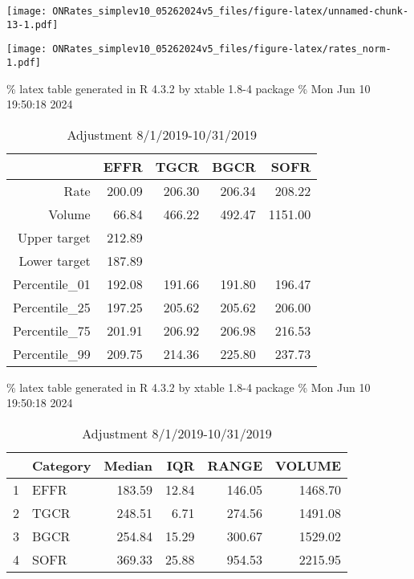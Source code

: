 \documentclass[
]{article}
\begin{document}
\FloatBarrier

\texttt{[image: ONRates\_simplev10\_05262024v5\_files/figure-latex/unnamed-chunk-13-1.pdf]}

\FloatBarrier

\FloatBarrier

\texttt{[image: ONRates\_simplev10\_05262024v5\_files/figure-latex/rates\_norm-1.pdf]}
\FloatBarrier

\% latex table generated in R 4.3.2 by xtable 1.8-4 package
\% Mon Jun 10 19:50:18 2024

\begin{table}[ht]
\centering
\begin{tabular}{rrrrr}
  \hline
 & EFFR & TGCR & BGCR & SOFR \\ 
  \hline
Rate & 200.09 & 206.30 & 206.34 & 208.22 \\ 
  Volume & 66.84 & 466.22 & 492.47 & 1151.00 \\ 
  Upper target & 212.89 &  &  &  \\ 
  Lower target & 187.89 &  &  &  \\ 
  Percentile\_01 & 192.08 & 191.66 & 191.80 & 196.47 \\ 
  Percentile\_25 & 197.25 & 205.62 & 205.62 & 206.00 \\ 
  Percentile\_75 & 201.91 & 206.92 & 206.98 & 216.53 \\ 
  Percentile\_99 & 209.75 & 214.36 & 225.80 & 237.73 \\ 
   \hline
\end{tabular}
\caption{Adjustment 8/1/2019-10/31/2019} 
\end{table}

\% latex table generated in R 4.3.2 by xtable 1.8-4 package
\% Mon Jun 10 19:50:18 2024

\begin{table}[ht]
\centering
\begin{tabular}{rlrrrr}
  \hline
 & Category & Median & IQR & RANGE & VOLUME \\ 
  \hline
1 & EFFR & 183.59 & 12.84 & 146.05 & 1468.70 \\ 
  2 & TGCR & 248.51 & 6.71 & 274.56 & 1491.08 \\ 
  3 & BGCR & 254.84 & 15.29 & 300.67 & 1529.02 \\ 
  4 & SOFR & 369.33 & 25.88 & 954.53 & 2215.95 \\ 
   \hline
\end{tabular}
\caption{Adjustment 8/1/2019-10/31/2019} 
\end{table}
\end{document}
